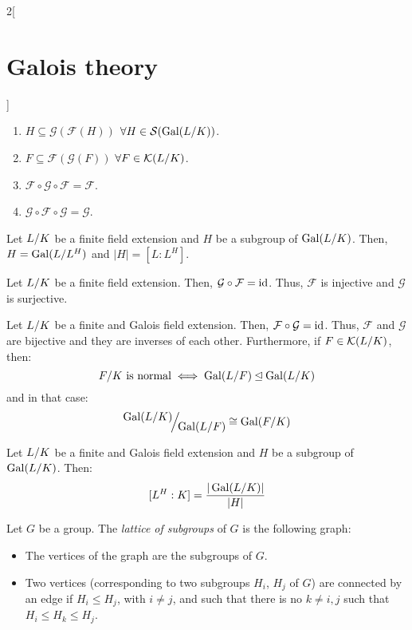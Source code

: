 \documentclass[../../../main.tex]{subfiles}
\begin{document}
\begin{multicols}{2}[\section{Galois theory}]
\begin{prop}
\begin{enumerate}
      \item $H\subseteq \mathcal{G}(\mathcal{F}(H))$ $\forall H\in \mathcal{S}(\Gal(\quot{L}{K}))$.
      \item $F\subseteq \mathcal{F}(\mathcal{G}(F))$ $\forall F\in \mathcal{K}(\quot{L}{K})$.
      \item $\mathcal{F}\circ\mathcal{G}\circ\mathcal{F}=\mathcal{F}$.
      \item $\mathcal{G}\circ\mathcal{F}\circ\mathcal{G}=\mathcal{G}$.
    \end{enumerate}
  \end{prop}
  \begin{lemma}
    Let $\quot{L}{K}$ be a finite field extension and $H$ be a subgroup of $\Gal(\quot{L}{K})$. Then, $H=\Gal(\quot{L}{L^H})$ and $|H|=[L:L^H]$.
  \end{lemma}
  \begin{corollary}
    Let $\quot{L}{K}$ be a finite field extension. Then, $\mathcal{G}\circ\mathcal{F}=\mathrm{id}$. Thus, $\mathcal{F}$ is injective and $\mathcal{G}$ is surjective.
  \end{corollary}
  \begin{theorem}
    Let $\quot{L}{K}$ be a finite and Galois field extension. Then, $\mathcal{F}\circ\mathcal{G}=\mathrm{id}$. Thus, $\mathcal{F}$ and $\mathcal{G}$ are bijective and they are inverses of each other. Furthermore, if $F\in\mathcal{K}(\quot{L}{K})$, then: $$\textstyle\quot{F}{K}\text{ is normal}\iff\Gal(\quot{L}{F})\unlhd\Gal(\quot{L}{K})$$ and in that case: $$\quot{\Gal(L/K)}{\Gal(L/F)}\cong\Gal(F/K)$$
  \end{theorem}
  \begin{corollary}
    Let $\quot{L}{K}$ be a finite and Galois field extension and $H$ be a subgroup of $\Gal(\quot{L}{K})$. Then: $$[L^H:K]=\frac{|\Gal(\quot{L}{K})|}{|H|}$$
  \end{corollary}
  \begin{definition}
    Let $G$ be a group. The \emph{lattice of subgroups} of $G$ is the following graph:
    \begin{itemize}
      \item The vertices of the graph are the subgroups of $G$.
      \item Two vertices (corresponding to two subgroups $H_i$, $H_j$ of $G$) are connected by an edge if $H_i\leq H_j$, with $i\ne j$, and such that there is no $k\ne i,j$ such that $H_i\leq H_k\leq H_j$.
    \end{itemize}
  \end{definition}

\end{multicols}
\end{document}
